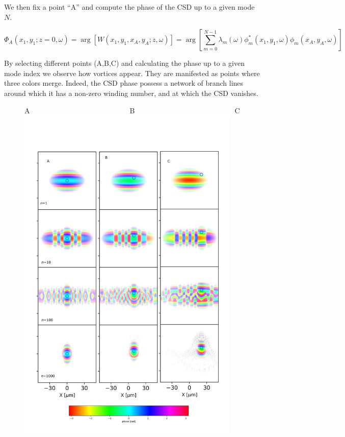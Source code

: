 \documentclass[a4paper,10pt]{article}
\begin{document}
We then fix a point ``A'' and compute the phase of the CSD up to a given mode $N$. 

\begin{equation}\label{phase_of_W}
\Phi_A(x_1,y_1;z=0,\omega)=\arg[W(x_1,y_1,x_A,y_A;z,\omega)]=\arg[
\sum_{m=0}^{N-1} \lambda_m(\omega)
\phi_m^*(x_1,y_1,\omega)
\phi_m(x_A,y_A, \omega)]
\end{equation}

By selecting different points (A,B,C) and calculating the phase up to a given mode index we observe how vortices appear. They are manifested as points where three colors merge.  Indeed, the CSD phase possess a network of branch lines around which it has a non-zero winding number, and at which the CSD vanishes.



\begin{figure}
A~~~~~~~~~~~~~~~~~~~~~~~~~~~~B~~~~~~~~~~~~~~~~~~~~~~~~~~~~C\\
\includegraphics[width=0.95\textwidth]{Figures/vx_id16a_ABC.png}
\end{figure}
 
\end{document}
